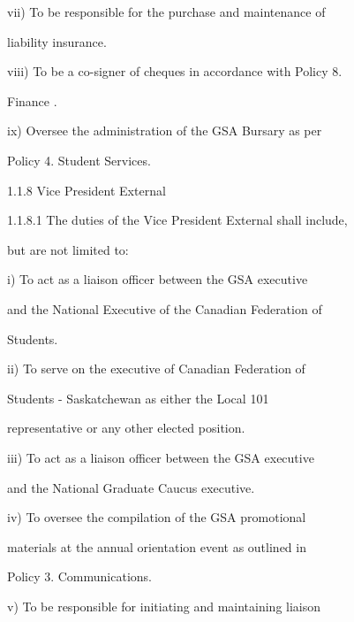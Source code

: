   

         vii)     To  be  responsible  for  the  purchase  and  maintenance  of  

                  liability insurance.   

  

         viii)    To be a co-signer of cheques in accordance with Policy 8.  

                  Finance .   

           



         ix)      Oversee  the  administration  of  the  GSA  Bursary  as  per  

                  Policy 4. Student Services.   

  

1.1.8  Vice President External  

  

1.1.8.1           The  duties of the  Vice  President  External  shall  include,  

         but are not limited to:   

  

         i)       To  act  as  a  liaison  officer  between  the  GSA  executive  

                  and the National Executive of the Canadian Federation of  

                  Students.   

  

         ii)      To  serve  on  the  executive  of  Canadian  Federation  of  

                  Students        -   Saskatchewan           as    either     the    Local      101  

                  representative or any other elected position.   

  

         iii)     To  act  as  a  liaison  officer  between  the  GSA  executive  

                  and the National Graduate Caucus executive.   

         iv)      To  oversee  the  compilation  of  the  GSA  promotional  

                  materials  at  the  annual  orientation  event  as  outlined  in  

                  Policy 3. Communications.   

         v)       To  be  responsible  for  initiating  and  maintaining  liaison  

